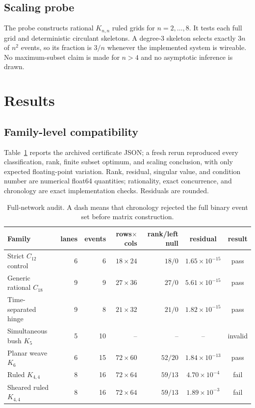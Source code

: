\documentclass[11pt]{article}
\theoremstyle{definition}
\theoremstyle{remark}
\begin{document}
\subsection{Scaling probe}
The probe constructs rational $K_{n,n}$ ruled grids for $n=2,\ldots,8$. It tests each full grid and deterministic circulant skeletons. A degree-3 skeleton selects exactly $3n$ of $n^2$ events, so its fraction is $3/n$ whenever the implemented system is wireable. No maximum-subset claim is made for $n>4$ and no asymptotic inference is drawn.

\section{Results}

\subsection{Family-level compatibility}
Table~\ref{tab:families} reports the archived certificate JSON; a fresh rerun reproduced every classification, rank, finite subset optimum, and scaling conclusion, with only expected floating-point variation. Rank, residual, singular value, and condition number are numerical float64 quantities; rationality, exact concurrence, and chronology are exact implementation checks. Residuals are rounded.

\begin{table}[ht]
\centering\small
\caption{Full-network audit. A dash means that chronology rejected the full binary event set before matrix construction.}\label{tab:families}
\vspace{0.35em}
\begin{tabular}{@{}lrrr r c c@{}}
\toprule
Family & lanes & events & rows$\times$cols & rank/left null & residual & result\\
\midrule
Strict $C_{12}$ control & 6 & 6 & $18\times24$ & $18/0$ & $1.65\times10^{-15}$ & pass\\
Generic rational $C_{18}$ & 9 & 9 & $27\times36$ & $27/0$ & $5.61\times10^{-15}$ & pass\\
Time-separated hinge & 9 & 8 & $21\times32$ & $21/0$ & $1.82\times10^{-15}$ & pass\\
Simultaneous bush $K_5$ & 5 & 10 & -- & -- & -- & invalid\\
Planar weave $K_6$ & 6 & 15 & $72\times60$ & $52/20$ & $1.84\times10^{-13}$ & pass\\
Ruled $K_{4,4}$ & 8 & 16 & $72\times64$ & $59/13$ & $4.70\times10^{-4}$ & fail\\
Sheared ruled $K_{4,4}$ & 8 & 16 & $72\times64$ & $59/13$ & $1.89\times10^{-3}$ & fail\\
\bottomrule
\end{tabular}
\end{table}
\end{document}
